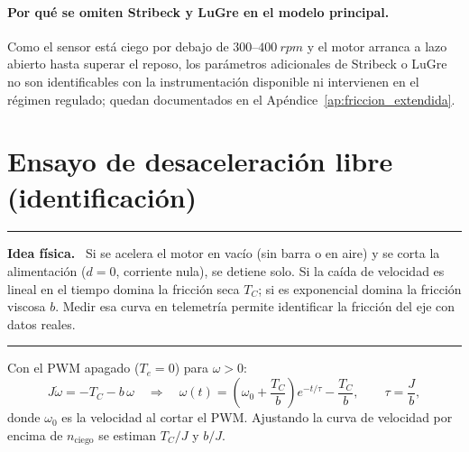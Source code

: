 \documentclass[11pt,a4paper,oneside]{report}
\theoremstyle{definition}
\theoremstyle{remark}
\newenvironment{idea}%
  {\par\medskip\noindent\begin{minipage}{\linewidth}\hrule\smallskip
   \noindent\textbf{Idea física.}\ }%
  {\smallskip\hrule\end{minipage}\par\medskip}
\begin{document}
\paragraph{Por qué se omiten Stribeck y LuGre en el modelo principal.} Como el
sensor está ciego por debajo de $300\text{--}\SI{400}{rpm}$ y el motor arranca a
lazo abierto hasta superar el reposo, los parámetros adicionales de Stribeck o
LuGre no son identificables con la instrumentación disponible ni intervienen en
el régimen regulado; quedan documentados en el Apéndice~\ref{ap:friccion_extendida}.

\section{Ensayo de desaceleración libre (identificación)}
\begin{idea}
Si se acelera el motor en vacío (sin barra o en aire) y se corta la
alimentación ($d=0$, corriente nula), se detiene solo. Si la caída de
velocidad es lineal en el tiempo domina la fricción seca $T_C$; si es
exponencial domina la fricción viscosa $b$. Medir esa curva en telemetría
permite identificar la fricción del eje con datos reales.
\end{idea}
Con el PWM apagado ($T_e=0$) para $\omega>0$:
\begin{equation}
  J\dot\omega = -T_C - b\,\omega
  \quad\Longrightarrow\quad
  \omega(t) = \left(\omega_0 + \frac{T_C}{b}\right)e^{-t/\tau} - \frac{T_C}{b},
  \qquad \tau = \frac{J}{b},
  \label{eq:coastdown}
\end{equation}
donde $\omega_0$ es la velocidad al cortar el PWM. Ajustando la curva de
velocidad por encima de $n_{\text{ciego}}$ se estiman $T_C/J$ y $b/J$.
\end{document}
